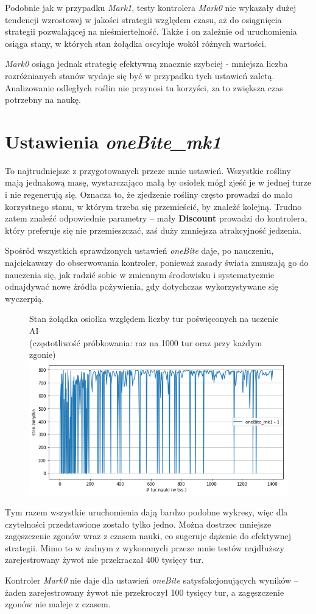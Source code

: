 Podobnie jak w przypadku \textit{Mark1}, testy kontrolera \textit{Mark0} nie wykazały dużej tendencji wzrostowej w jakości strategii względem czasu, aż do osiągnięcia strategii pozwalającej na nieśmiertelność. Także i on zależnie od uruchomienia osiąga stany, w których stan żołądka oscyluje wokół różnych wartości.

\textit{Mark0} osiąga jednak strategię efektywną znacznie szybciej - mniejsza liczba rozróżnianych stanów wydaje się być w przypadku tych ustawień zaletą. Analizowanie odległych roślin nie przynosi tu korzyści, za to zwiększa czas potrzebny na naukę.

\section{Ustawienia \textit{oneBite\_mk1}}
To najtrudniejsze z przygotowanych przeze mnie ustawień. Wszystkie rośliny mają jednakową masę, wystarczająco małą by osiołek mógł zjeść je w jednej turze i nie regenerują się. Oznacza to, że zjedzenie rośliny często prowadzi do mało korzystnego stanu, w którym trzeba się przemieścić, by znaleźć kolejną. Trudno zatem znaleźć odpowiednie parametry -- mały \textbf{Discount} prowadzi do kontrolera, który preferuje się nie przemieszczać, zaś duży zmniejsza atrakcyjność jedzenia.

Spośród wszystkich sprawdzonych ustawień \textit{oneBite} daje, po nauczeniu, najciekawszy do obserwowania kontroler, ponieważ zasady świata zmuszają go do nauczenia się, jak radzić sobie w zmiennym środowisku i systematycznie odnajdywać nowe źródła pożywienia, gdy dotychczas wykorzystywane się wyczerpią.
\begin{figure}[H]
    \centering
    \footnotesize{Stan żołądka osiołka względem liczby tur poświęconych na uczenie AI
    \\(częstotliwość próbkowania: raz na 1000 tur oraz przy każdym zgonie)}
    \includegraphics[scale=0.6]{Chapters/oneBite_mk1}
\end{figure}
Tym razem wszystkie uruchomienia dają bardzo podobne wykresy, więc dla czytelności przedstawione zostało tylko jedno. Można dostrzec mniejsze zagęszczenie zgonów wraz z czasem nauki, co sugeruje dążenie do efektywnej strategii. Mimo to w żadnym z wykonanych przeze mnie testów najdłuższy zarejestrowany żywot nie przekraczał 400 tysięcy tur.

Kontroler \textit{Mark0} nie daje dla ustawień \textit{oneBite} satysfakcjonujących wyników -- żaden zarejestrowany żywot nie przekroczył 100 tysięcy tur, a zagęszczenie zgonów nie maleje z czasem.
